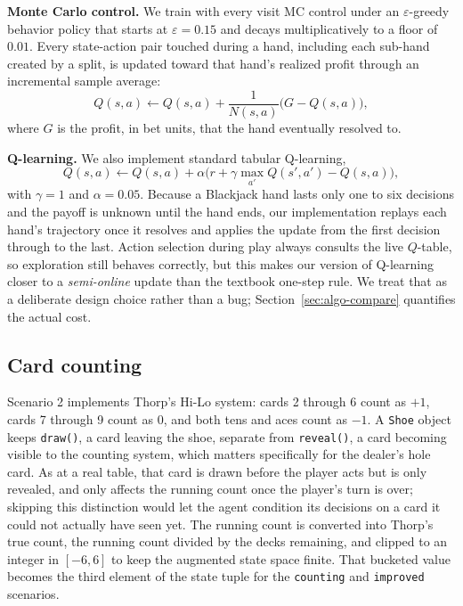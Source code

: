 \documentclass[conference,a4paper]{IEEEtran}
\begin{document}
\textbf{Monte Carlo control.} We train with every visit MC control under an $\varepsilon$-greedy behavior policy that starts at $\varepsilon = 0.15$ and decays multiplicatively to a floor of $0.01$. Every state-action pair touched during a hand, including each sub-hand created by a split, is updated toward that hand's realized profit through an incremental sample average:
\begin{equation}
Q(s,a) \leftarrow Q(s,a) + \frac{1}{N(s,a)}\big(G - Q(s,a)\big),
\end{equation}
where $G$ is the profit, in bet units, that the hand eventually resolved to.

\textbf{Q-learning.} We also implement standard tabular Q-learning,
\begin{equation}
Q(s,a) \leftarrow Q(s,a) + \alpha\big(r + \gamma\max_{a'}Q(s',a') - Q(s,a)\big),
\end{equation}
with $\gamma = 1$ and $\alpha = 0.05$. Because a Blackjack hand lasts only one to six decisions and the payoff is unknown until the hand ends, our implementation replays each hand's trajectory once it resolves and applies the update from the first decision through to the last. Action selection during play always consults the live $Q$-table, so exploration still behaves correctly, but this makes our version of Q-learning closer to a \emph{semi-online} update than the textbook one-step rule. We treat that as a deliberate design choice rather than a bug; Section~\ref{sec:algo-compare} quantifies the actual cost.

\subsection{Card counting}
\label{sec:counting}
Scenario 2 implements Thorp's Hi-Lo system: cards 2 through 6 count as $+1$, cards 7 through 9 count as $0$, and both tens and aces count as $-1$. A \texttt{Shoe} object keeps \texttt{draw()}, a card leaving the shoe, separate from \texttt{reveal()}, a card becoming visible to the counting system, which matters specifically for the dealer's hole card. As at a real table, that card is drawn before the player acts but is only revealed, and only affects the running count once the player's turn is over; skipping this distinction would let the agent condition its decisions on a card it could not actually have seen yet. The running count is converted into Thorp's true count, the running count divided by the decks remaining, and clipped to an integer in $[-6,6]$ to keep the augmented state space finite. That bucketed value becomes the third element of the state tuple for the \texttt{counting} and \texttt{improved} scenarios.
\end{document}
